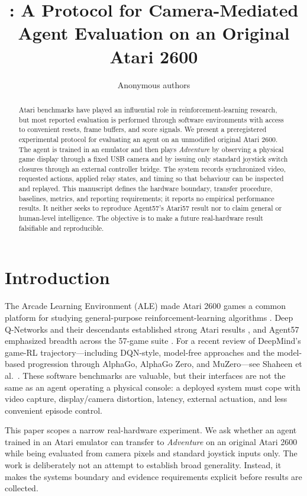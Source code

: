 \documentclass[11pt]{article}
\title{\project: A Protocol for Camera-Mediated Agent Evaluation on an Original Atari 2600}
\author{Anonymous authors\\
\texttt{\todo{replace with author names, affiliations, and contact}}}
\date{\todo{replace with submission date}}
\begin{document}
\maketitle

\begin{abstract}
Atari benchmarks have played an influential role in reinforcement-learning
research, but most reported evaluation is performed through software
environments with access to convenient resets, frame buffers, and score
signals.  We present a preregistered experimental protocol for evaluating an
agent on an unmodified original Atari 2600.  The agent is trained in an
emulator and then plays \emph{Adventure} by observing a physical game display
through a fixed USB camera and by issuing only standard joystick switch
closures through an external controller bridge.  The system records
synchronized video, requested actions, applied relay states, and timing so
that behaviour can be inspected and replayed.  This manuscript defines the
hardware boundary, transfer procedure, baselines, metrics, and reporting
requirements; it reports no empirical performance results.  It neither seeks
to reproduce Agent57's Atari57 result nor to claim general or human-level
intelligence.  The objective is to make a future real-hardware result
falsifiable and reproducible.
\end{abstract}

\section{Introduction}

The Arcade Learning Environment (ALE) made Atari 2600 games a common platform
for studying general-purpose reinforcement-learning algorithms
\cite{bellemare2013arcade}.  Deep Q-Networks and their descendants established
strong Atari results \cite{mnih2015human,kapturowski2019recurrent}, and
Agent57 emphasized breadth across the 57-game suite \cite{badia2020agent57}.
For a recent review of DeepMind's game-RL trajectory---including DQN-style,
model-free approaches and the model-based progression through AlphaGo,
AlphaGo Zero, and MuZero---see Shaheen et al.\ \cite{shaheen2025review}.
These software benchmarks are valuable, but their interfaces are not the same
as an agent operating a physical console: a deployed system must cope with
video capture, display/camera distortion, latency, external actuation, and
less convenient episode control.

This paper scopes a narrow real-hardware experiment.  We ask whether an agent
trained in an Atari emulator can transfer to \emph{Adventure} on an original
Atari 2600 while being evaluated from camera pixels and standard joystick
inputs only.  The work is deliberately not an attempt to establish broad
generality.  Instead, it makes the systems boundary and evidence requirements
explicit before results are collected.
\end{document}
